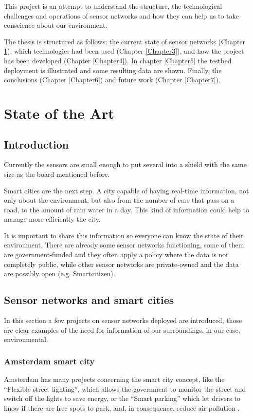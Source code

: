 \documentclass[12pt, a4paper,twoside]{tesi_upf}
\begin{document}
  This project is an attempt to understand the structure, the technological challenges and operations of sensor networks and how they can help us to take conscience about our environment.

  The thesis is structured as follows: the current state of sensor networks (Chapter \ref{Chapter2}), which technologies had been used (Chapter \ref{Chapter3}), and how the project has been developed (Chapter \ref{Chapter4}). 
  In chapter \ref{Chapter5} the testbed deployment is illustrated and some resulting data are shown.
  Finally, the conclusions (Chapter \ref{Chapter6}) and future work (Chapter \ref{Chapter7}).
  
\chapter{State of the Art}
\label{Chapter2}
  
  \section{Introduction}

    Currently the sensors are small enough to put several into a shield with the same size as the board mentioned before.
    
    Smart cities are the next step. A city capable of having real-time information, not only about the environment, but also from the number of cars that pass on a road, to the amount of rain water in a day. This kind of information could help to manage more efficiently the city.
    
    It is important to share this information so everyone can know the state of their environment. There are already some sensor networks functioning, some of them are government-funded and they often apply a policy where the data is not completely public, while other sensor networks are private-owned and the data are possibly open (e.g. Smartcitizen).

  \section{Sensor networks and smart cities}
    In this section a few projects on sensor networks deployed are introduced, those are clear examples of the need for information of our surroundings, in our case, environmental.
    
    \subsection{Amsterdam smart city}
      Amsterdam has many projects concerning the smart city concept, like the ``Flexible street lighting'', which allows the government to monitor the street and switch off the lights to save energy, or the ``Smart parking'' which let drivers to know if there are free spots to park, and, in consequence, reduce air pollution \cite{SmartcityAmsterdam}.
      
\end{document}
